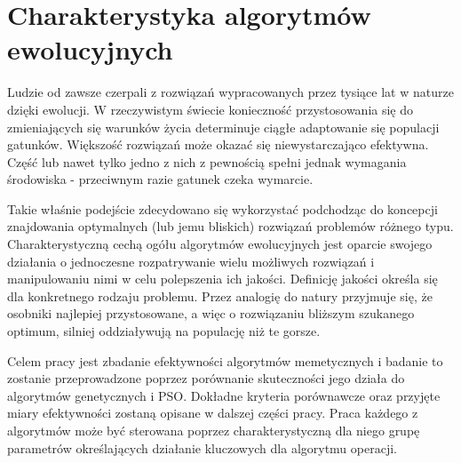 \chapter{Charakterystyka algorytmów ewolucyjnych}
\par
Ludzie od zawsze czerpali z rozwiązań wypracowanych przez tysiące lat w naturze dzięki ewolucji. W rzeczywistym świecie konieczność przystosowania się do zmieniających się warunków życia determinuje ciągłe adaptowanie się populacji gatunków. Większość rozwiązań może okazać się niewystarczająco efektywna. Część lub nawet tylko jedno z nich z pewnością spełni jednak wymagania środowiska - przeciwnym razie gatunek czeka wymarcie. 
\par
Takie właśnie podejście zdecydowano się wykorzystać podchodząc do koncepcji znajdowania optymalnych (lub jemu bliskich) rozwiązań problemów różnego typu. Charakterystyczną cechą ogółu algorytmów ewolucyjnych jest oparcie swojego działania o jednoczesne rozpatrywanie wielu możliwych rozwiązań i manipulowaniu nimi w celu polepszenia ich jakości. Definicję jakości określa się dla konkretnego rodzaju problemu. Przez analogię do natury przyjmuje się, że osobniki najlepiej przystosowane, a więc o rozwiązaniu bliższym szukanego optimum, silniej oddziaływują na populację niż te gorsze. 
\par
Celem pracy jest zbadanie efektywności algorytmów memetycznych i badanie to zostanie przeprowadzone poprzez porównanie skuteczności jego działa do algorytmów genetycznych i PSO. Dokładne kryteria porównawcze oraz przyjęte miary efektywności zostaną opisane w dalszej części pracy. Praca każdego z algorytmów może być sterowana poprzez charakterystyczną dla niego grupę parametrów określających działanie kluczowych dla algorytmu operacji. 
